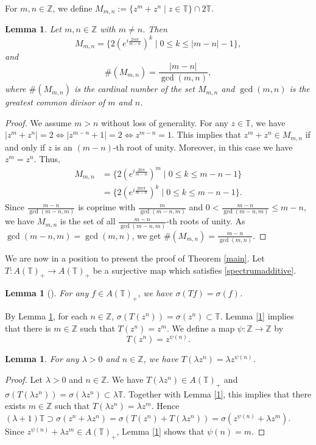 \documentclass[10pt]{amsart}
\newtheorem{lemma}[theorem]{Lemma}
\begin{document}
For $m,n \in \mathbb{Z}$, we define $M_{m,n}:=\{ z^{m}+z^{n} \mid z \in \mathbb{T} \} \cap 2\mathbb{T}$. 
\begin{lemma}\label{2}
Let $m,n \in \mathbb{Z}$ with $m \neq n$. Then 
\[
M_{m,n}=\{ 2(e^{i\frac{2m\pi}{m-n}})^k \mid 0 \le k \le |m-n|-1\},
\]
and 
\[
\#(M_{m,n})=\frac{|m-n|}{\operatorname{gcd}(m,n)},
\]
where $\#(M_{m,n})$ is the cardinal number of the set $M_{m,n}$ and $\operatorname{gcd}(m,n)$ is the greatest common divisor of $m$ and $n$.
\end{lemma}
\begin{proof}
We assume $m>n$ without loss of generality. For any $z \in \mathbb{T}$, we have $|z^m+z^n|=2 \Longleftrightarrow |z^{m-n}+1|=2 \Longleftrightarrow z^{m-n}=1$. This implies that $z^{m}+z^{n} \in M_{m,n}$ if and only if $z$ is an $(m-n)$-th root of unity. Moreover, in this case we have $z^m=z^n$. Thus, 
\begin{equation*}
\begin{split}
M_{m,n}&=\{ 2(e^{i\frac{2k\pi}{m-n}})^m \mid 0 \le k \le m-n-1 \}\\&=\{ 2(e^{i\frac{2m\pi}{m-n}})^k \mid 0 \le k \le m-n-1\}.
\end{split}
\end{equation*}
Since $\frac{m-n}{\operatorname{gcd}(m-n,m)}$ is coprime with $\frac{m}{\operatorname{gcd}(m-n,m)}$ and $0<\frac{m-n}{\operatorname{gcd}(m-n,m)} \le m-n$, we have $M_{m,n}$ is the set of all $\frac{m-n}{\operatorname{gcd}(m-n,m)}$-th roots of unity. As $\operatorname{gcd}(m-n,m)=\operatorname{gcd}(m,n)$, we get $\#(M_{m,n})=\frac{m-n}{\operatorname{gcd}(m,n)}$.
\end{proof}

We are now in a position to present the proof of Theorem \ref{main}. 
Let $T:A(\mathbb{T})_{+} \to A(\mathbb{T})_{+}$ be a surjective map which satisfies \eqref{spectrumadditive}. 
\begin{lemma}[{\cite[Lemma 2.4]{LO}}]\label{s0}
For any $f \in A(\mathbb{T})_{+}$,  we have $\sigma(Tf)=\sigma(f)$.
\end{lemma}

By Lemma \ref{s0}, for each $n \in \mathbb{Z}$, 
 $\sigma(T(z^n))=\sigma(z^n) \subset \mathbb{T}$. Lemma \ref{1} implies that there is $m \in \mathbb{Z}$ such that $T(z^n)=z^{m}$.  
We define a map $\psi:\mathbb{Z} \to \mathbb{Z}$ by
\[
T(z^{n})=z^{\psi(n)}.
\]

\begin{lemma}\label{3}
For any $\lambda>0$ and $n \in \mathbb{Z}$, we have $T(\lambda z^n)=\lambda z^{\psi(n)}$.
\end{lemma}
\begin{proof}
Let $\lambda>0$ and $n \in \mathbb{Z}$.  
We have $T(\lambda z^n) \in A(\mathbb{T})_{+}$ and $\sigma(T(\lambda z^n))=\sigma(\lambda z^n) \subset \lambda \mathbb{T}$. Together with Lemma \ref{1}, this implies that there exists $m \in \mathbb{Z}$ such that $T(\lambda z^n)=\lambda z^{m}$. Hence $(\lambda+1) \mathbb{T} \supset \sigma(z^n+\lambda z^n)=\sigma(T(z^n)+T(\lambda z^n))=\sigma(z^{\psi(n)}+\lambda z^{m})$. Since $z^{\psi(n)}+\lambda z^{m} \in A(\mathbb{T})_{+}$, Lemma \ref{1} shows that $\psi(n)=m$. 
\end{proof}
\end{document}
